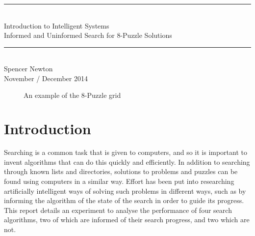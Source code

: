 \documentclass[12pt]{article}
\newcommand{\HRule}{\rule{\linewidth}{0.5mm}}
\begin{document}
\pagestyle{fancy}
\cfoot{\thepage}

\begin{titlepage}
\begin{center}
\HRule \\[0.2cm]
{\huge Introduction to Intelligent Systems \\[0.2cm] }
{\Large Informed and Uninformed Search for 8-Puzzle Solutions \\[0.2cm]}
\HRule \\[0.4cm]
{\large Spencer Newton \\[0.2cm]}
{\large November / December 2014 \\[0.5cm]}
\begin{figure}[h]
	\caption{An example of the 8-Puzzle grid}
\end{figure}
\end{center}
\end{titlepage}


\tableofcontents

\newpage

\section{Introduction}
Searching is a common task that is given to computers, and so it is important to invent algorithms that can do this quickly and efficiently. In addition to searching through known lists and directories, solutions to problems and puzzles can be found using computers in a similar way. Effort has been put into researching artificially intelligent ways of solving such problems in different ways, such as by informing the algorithm of the state of the search in order to guide its progress. This report details an experiment to analyse the performance of four search algorithms, two of which are informed of their search progress, and two which are not.
\end{document}

